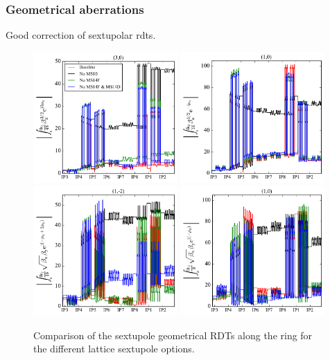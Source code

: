 \documentclass{cernatsnote}
\begin{document}
\subsubsection{Geometrical aberrations}

Good correction of sextupolar rdts.

\begin{figure}[h!]
\centering
\includegraphics[width=0.49\textwidth]{images/3000_rdt_all_b1.pdf} \hfill \includegraphics[width=0.49\textwidth]{images/1200_rdt_all_b1.pdf} \\
\includegraphics[width=0.49\textwidth]{images/0120_rdt_all_b1.pdf} \hfill \includegraphics[width=0.49\textwidth]{images/0111_rdt_all_b1.pdf}
\caption{\label{rdt_twiss_all} Comparison of the sextupole geometrical RDTs along the ring for the different lattice sextupole options.}
\end{figure}
\end{document}
